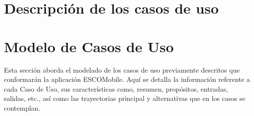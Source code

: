 \documentclass[oneside,10pt]{book}
\begin{document}

\chapter{Descripción de los casos de uso}

\chapter{Modelo de Casos de Uso}
\noindent
Esta sección aborda el modelado de los casos de uso previamente descritos que conformarán la aplicación ESCOMobile. Aquí se detalla la información referente a cada Caso de Uso, sus características como, resumen, propósitos, entradas, salidas, etc., así como las trayectorias principal y alternativas que en los casos se contemplan. 






%


\end{document}
